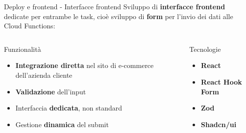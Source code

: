 \documentclass{beamer}
\begin{document}
	\begin{frame}{Deploy e frontend - Interfacce frontend}
		Sviluppo di \textbf{interfacce frontend} dedicate per entrambe le task, cioè sviluppo di \textbf{form} per l'invio dei dati alle Cloud Functions:

		\begin{columns}
			\begin{column}{0.64\textwidth}
				\begin{exampleblock}{Funzionalità}
					\begin{itemize}
						\item \textbf{Integrazione diretta} nel sito di e-commerce dell'azienda cliente
						\item \textbf{Validazione} dell'input
						\item Interfaccia \textbf{dedicata}, non standard
						\item Gestione \textbf{dinamica} del submit
					\end{itemize}
				\end{exampleblock}
			\end{column}
			\begin{column}{0.36\textwidth}
				\begin{alertblock}{Tecnologie}
					\begin{itemize}
						\item \textbf{React}
						\item \textbf{React Hook Form}
						\item \textbf{Zod}
						\item \textbf{Shadcn/ui}
					\end{itemize}
				\end{alertblock}
			\end{column}
		\end{columns}


\end{frame}
\end{document}
